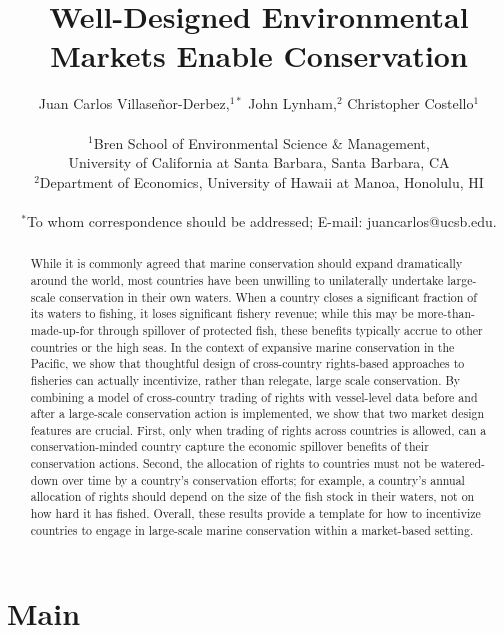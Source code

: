 \documentclass[12pt]{article}
\title{Well-Designed Environmental Markets Enable Conservation}
\author{Juan Carlos Villase\~{n}or-Derbez,$^{1\ast}$ John Lynham,$^{2}$ Christopher Costello$^{1}$\\
\\
\normalsize{$^{1}$Bren School of Environmental Science \& Management,}\\
\normalsize{University of California at Santa Barbara, Santa Barbara, CA}\\
\normalsize{$^{2}$Department of Economics, University of Hawaii at Manoa, Honolulu, HI}\\
\\
\normalsize{$^\ast$To whom correspondence should be addressed; E-mail: juancarlos@ucsb.edu.}
}
\date{}
\begin{document}

\baselineskip24pt


\maketitle



\begin{abstract}
While it is commonly agreed that marine conservation should expand dramatically around the world, most countries have been unwilling to unilaterally undertake large-scale conservation in their own waters. When a country closes a significant fraction of its waters to fishing, it loses significant fishery revenue; while this may be more-than-made-up-for through spillover of protected fish, these benefits typically accrue to other countries or the high seas. In the context of expansive marine conservation in the Pacific, we show that thoughtful design of cross-country rights-based approaches to fisheries can actually incentivize, rather than relegate, large scale conservation. By combining a model of cross-country trading of rights
with vessel-level data before and after a large-scale conservation action is implemented, we show that two market design features are crucial.  First, only when trading of rights across countries is allowed, can a conservation-minded country capture the economic spillover benefits of their conservation actions. Second, the allocation of rights to countries must not be watered-down over time by a country's conservation efforts; for example, a country's annual allocation of rights should depend on the size of the fish stock in their waters, not on how hard it has fished. Overall, these results provide a 
template for how to incentivize countries to engage in large-scale marine conservation within a market-based setting.
\end{abstract}

\clearpage

\section{Main}
\end{document}
